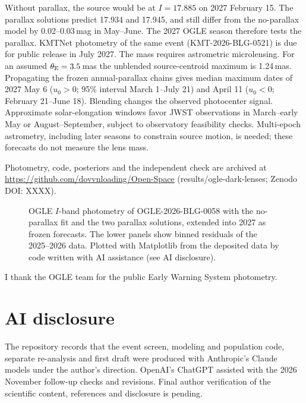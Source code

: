 \documentclass{aastex701}
\begin{document}
Without parallax, the source would be at $I=17.885$ on 2027 February 15. The parallax solutions predict 17.934 and 17.945, and still differ from the no-parallax model by 0.02--0.03\,mag in May--June. The 2027 OGLE season therefore tests the parallax. KMTNet photometry of the same event (KMT-2026-BLG-0521) is due for public release in July 2027. The mass requires astrometric microlensing. For an assumed $\theta_{\rm E}=3.5$\,mas the unblended source-centroid maximum is 1.24\,mas. Propagating the frozen annual-parallax chains gives median maximum dates of 2027 May 6 ($u_0>0$; 95\% interval March 1--July 21) and April 11 ($u_0<0$; February 21--June 18). Blending changes the observed photocenter signal. Approximate solar-elongation windows favor JWST observations in March--early May or August--September, subject to observatory feasibility checks. Multi-epoch astrometry, including later seasons to constrain source motion, is needed; these forecasts do not measure the lens mass.

Photometry, code, posteriors and the independent check are archived at \url{https://github.com/dovvnloading/Open-Space} (results/ogle-dark-lenses; Zenodo DOI: XXXX).

\begin{figure}[ht!]
\caption{OGLE $I$-band photometry of OGLE-2026-BLG-0058 with the no-parallax fit and the two parallax solutions, extended into 2027 as frozen forecasts. The lower panels show binned residuals of the 2025--2026 data. Plotted with Matplotlib from the deposited data by code written with AI assistance (see AI disclosure).\label{fig:lc}}
\end{figure}

\begin{acknowledgments}
I thank the OGLE team for the public Early Warning System photometry.
\end{acknowledgments}

\section*{AI disclosure}
The repository records that the event screen, modeling and population code, separate re-analysis and first draft were produced with Anthropic's Claude models under the author's direction. OpenAI's ChatGPT assisted with the 2026 November follow-up checks and revisions. Final author verification of the scientific content, references and disclosure is pending.
\end{document}
